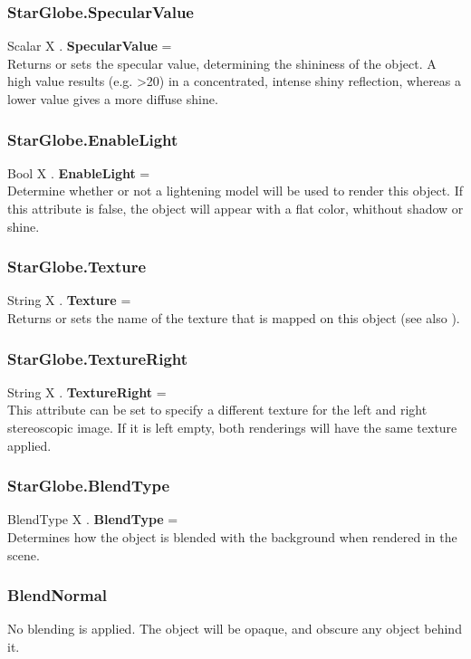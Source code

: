 \subsubsection{StarGlobe.SpecularValue \label{F:StarGlobe:SpecularValue}}
Scalar X . \textbf{SpecularValue} = \\
Returns or sets the specular value, determining the shininess of the object. A high value results (e.g. >20) in a concentrated, intense shiny reflection, whereas a lower value gives a more diffuse shine.

\subsubsection{StarGlobe.EnableLight \label{F:StarGlobe:EnableLight}}
Bool X . \textbf{EnableLight} = \\
Determine whether or not a lightening model will be used to render this object. If this attribute is false, the object will appear with a flat color, whithout shadow or shine.

\subsubsection{StarGlobe.Texture \label{F:StarGlobe:Texture}}
String X . \textbf{Texture} = \\
Returns or sets the name of the texture that is mapped on this object (see also ).

\subsubsection{StarGlobe.TextureRight \label{F:StarGlobe:TextureRight}}
String X . \textbf{TextureRight} = \\
This attribute can be set to specify a different texture for the left and right stereoscopic image. If it is left empty, both renderings will have the same texture applied.

\subsubsection{StarGlobe.BlendType \label{F:StarGlobe:BlendType}}
BlendType X . \textbf{BlendType} = \\
Determines how the object is blended with the background when rendered in the scene.

\subsubsection{BlendNormal \label{T:BlendType|BlendNormal}}
No blending is applied. The object will be opaque, and obscure any object behind it.

